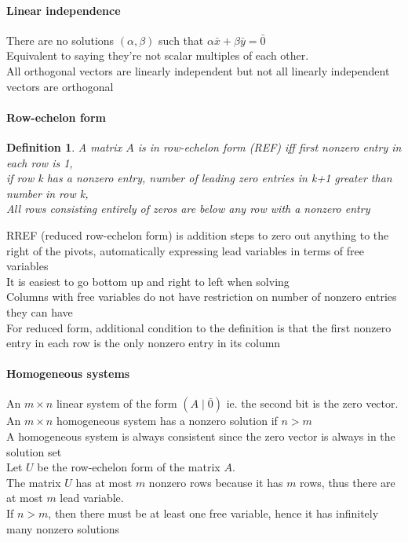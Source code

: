 \documentclass{article}
\newtheorem{definition}{Definition}[subsection]
\begin{document}
\paragraph{Linear independence}
There are no solutions $(\alpha, \beta)$ such that $\alpha \bar{x} + \beta \bar{y} = \bar{0}$ \\
Equivalent to saying they're not scalar multiples of each other. \\
All orthogonal vectors are linearly independent but not all linearly independent vectors are orthogonal 
\paragraph{Row-echelon form}
\begin{definition}
    A matrix $A$ is in row-echelon form (REF) iff first nonzero entry in each row is 1, \\
    if row k has a nonzero entry, number of leading zero entries in k+1 greater than number in row k, \\
    All rows consisting entirely of zeros are below any row with a nonzero entry 
\end{definition}
RREF (reduced row-echelon form) is addition steps to zero out anything to the right of the pivots,
automatically expressing lead variables in terms of free variables\\
It is easiest to go bottom up and right to left when solving\\
Columns with free variables do not have restriction on number of nonzero entries they can have\\
For reduced form, additional condition to the definition is that the first nonzero entry in each row is the only nonzero entry in its column

\paragraph{Homogeneous systems}
An $m \times n$ linear system of the form $(A \mid \bar{0})$ ie. the second bit is the zero vector.\\
An $m \times n$ homogeneous system has a nonzero solution if $n>m$\\
A homogeneous system is always consistent since the zero vector is always in the solution set \\
Let $U$ be the row-echelon form of the matrix $A$. \\
The matrix $U$ has at most $m$ nonzero rows because it has $m$ rows,
thus there are at most $m$ lead variable. \\
If $n>m$, then there must be at least one free variable, hence it has infinitely many nonzero solutions\\
\end{document}
